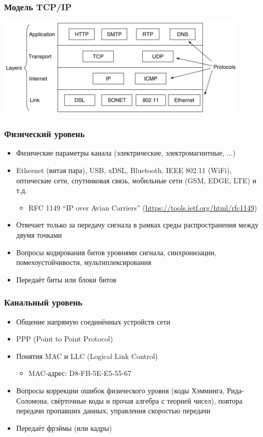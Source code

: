 \documentclass{../../slides-style}
\begin{document}
    \begin{frame}
        \frametitle{Модель TCP/IP}
        \begin{center}
            \includegraphics[width=0.9\textwidth]{tcpIpStack.png}
        \end{center}
    \end{frame}

    \begin{frame}
        \frametitle{Физический уровень}
        \begin{itemize}
            \item Физические параметры канала (электрические, электромагнитные, ...)
            \item Ethernet (витая пара), USB, xDSL, Bluetooth, IEEE 802.11 (WiFi), оптические сети, спутниковая связь, мобильные сети (GSM, EDGE, LTE) и т.д.
            \begin{itemize}
                \item RFC 1149 ``IP over Avian Carriers'' (\url{https://tools.ietf.org/html/rfc1149})
            \end{itemize}
            \item Отвечает только за передачу сигнала в рамках среды распространения между двумя точками
            \item Вопросы кодирования битов уровнями сигнала, синхронизации, помехоустойчивости, мультиплексирования
            \item Передаёт биты или блоки битов
        \end{itemize}
    \end{frame}

    \begin{frame}
        \frametitle{Канальный уровень}
        \begin{itemize}
            \item Общение напрямую соединённых устройств сети
            \item PPP (Point to Point Protocol)
            \item Понятия MAC и LLC (Logical Link Control)
            \begin{itemize}
                \item MAC-адрес: D8-FB-5E-E5-55-67
            \end{itemize}
            \item Вопросы коррекции ошибок физического уровня (коды Хэмминга, Рида-Соломона, свёрточные коды и прочая алгебра с теорией чисел), повтора передачи пропавших данных, управления скоростью передачи
            \item Передаёт фрэймы (или кадры)
        \end{itemize}
    \end{frame}
\end{document}
